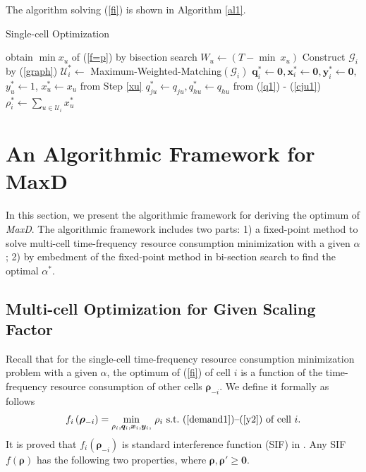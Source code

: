 \documentclass[10pt,journal,final,finalsubmission,twocolumn]{IEEEtran}
\begin{document}
The algorithm solving (\ref{fi}) is shown in Algorithm \ref{al1}.

 \begin{algorithm}[tbp]\label{al1}
\caption{Single-cell Optimization} 
{
	obtain $\min x_u$ of (\ref{f=p}) by bisection search\label{xu}\;
	$W_u \leftarrow (T-\min \ x_u)$\;
}
Construct $\mathcal{G}_i$ by (\ref{graph})\;
$\mathcal{U}^*_i\leftarrow $ Maximum-Weighted-Matching$\left (\mathcal{G}_i\right)$\label{MWM}\;
$\boldsymbol{q}^*_i \leftarrow \boldsymbol{0},\boldsymbol{x}^*_i \leftarrow \boldsymbol{0}, \boldsymbol{y}^*_i \leftarrow \boldsymbol{0},$\;
{
$y_u^*\leftarrow1$, $x_u^* \leftarrow x_u$ from Step \ref{xu} \;
$q_{ju}^*\leftarrow q_{ju}, q_{hu}^*\leftarrow q_{hu}$ from (\ref{q1}) - (\ref{cju1})\;
}
$\rho_i^*\leftarrow\sum_{u\in{\mathcal{U}}_i} x_u^*$\;
\;
\end{algorithm} 


\section{An Algorithmic Framework for MaxD}\label{CellLoadsMinimization}

In this section, we present the algorithmic framework for deriving the optimum of {\em MaxD}. The algorithmic framework includes two parts: 1) a fixed-point method to solve multi-cell time-frequency resource consumption minimization with a given $\alpha$; 2) by embedment of the fixed-point method in bi-section search to find the optimal $\alpha^*$.

\subsection{Multi-cell Optimization for Given Scaling Factor}\label{MulticellLoadsMinimization}

Recall that for the single-cell time-frequency resource consumption minimization problem with a given $\alpha$, the optimum of (\ref{fi}) of cell $i$ is a function of the time-frequency resource consumption of other cells $\boldsymbol{\rho}_{-i}$. We define it formally as follows
\begin{equation}\label{fi2}
f_i\left (\boldsymbol{\rho}_{-i}\right ) =  \underset{\rho_i, \boldsymbol{q}_i,\boldsymbol{x}_i,\boldsymbol{y}_i,}{\min} \ \rho_i\  \textup{s.t.\ (\ref{demand1})--(\ref{y2}) of cell $i$} .
\end{equation}
It is proved that $f_i\left (\boldsymbol{\rho}_{-i}\right )$ is standard interference function (SIF) in \cite{Yates}. Any SIF $f\left( \boldsymbol{\rho}\right)$ has the following two properties, where $\boldsymbol{\rho}, \boldsymbol{\rho}' \geq \boldsymbol{0}$.
\end{document}
